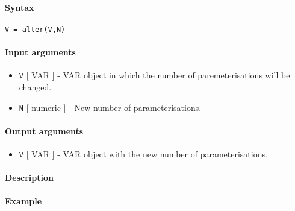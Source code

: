 


	\paragraph{Syntax}\label{syntax}

\begin{verbatim}
V = alter(V,N)
\end{verbatim}

\paragraph{Input arguments}\label{input-arguments}

\begin{itemize}
\item
  \texttt{V} {[} VAR {]} - VAR object in which the number of
  paremeterisations will be changed.
\item
  \texttt{N} {[} numeric {]} - New number of parameterisations.
\end{itemize}

\paragraph{Output arguments}\label{output-arguments}

\begin{itemize}
\itemsep1pt\parskip0pt
\item
  \texttt{V} {[} VAR {]} - VAR object with the new number of
  parameterisations.
\end{itemize}

\paragraph{Description}\label{description}

\paragraph{Example}\label{example}


